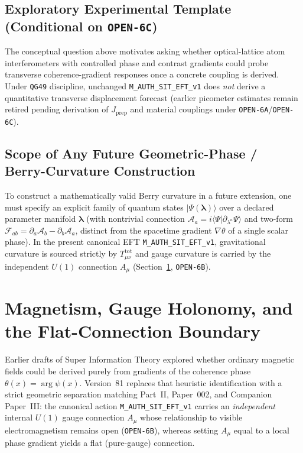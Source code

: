\subsection{Exploratory Experimental Template (Conditional on \texttt{OPEN-6C})}

The conceptual question above motivates asking whether optical-lattice atom interferometers with controlled phase and contrast gradients could probe transverse coherence-gradient responses once a concrete coupling is derived. Under \texttt{QG49} discipline, unchanged \texttt{M\_AUTH\_SIT\_EFT\_v1} does \emph{not} derive a quantitative transverse displacement forecast (earlier picometer estimates remain retired pending derivation of $J_{\mathrm{prep}}$ and material couplings under \texttt{OPEN-6A}/\texttt{OPEN-6C}).

\subsection{Scope of Any Future Geometric-Phase / Berry-Curvature Construction}

To construct a mathematically valid Berry curvature in a future extension, one must specify an explicit family of quantum states $|\Psi(\boldsymbol{\lambda})\rangle$ over a declared parameter manifold $\boldsymbol{\lambda}$ (with nontrivial connection $\mathcal{A}_a = i\langle\Psi|\partial_{\lambda^a}\Psi\rangle$ and two-form $\mathcal{F}_{ab} = \partial_a\mathcal{A}_b - \partial_b\mathcal{A}_a$, distinct from the spacetime gradient $\nabla\theta$ of a single scalar phase). In the present canonical EFT \texttt{M\_AUTH\_SIT\_EFT\_v1}, gravitational curvature is sourced strictly by $T_{\mu\nu}^{\mathrm{tot}}$ and gauge curvature is carried by the independent $U(1)$ connection $A_\mu$ (Section~\ref{sec:magnetism-holonomy}, \texttt{OPEN-6B}).

\vspace{1cm}

\section{Magnetism, Gauge Holonomy, and the Flat-Connection Boundary}
\label{sec:magnetism-holonomy}
\label{sec:magnetism_as_holonomy}

Earlier drafts of Super Information Theory explored whether ordinary magnetic fields could be derived purely from gradients of the coherence phase $\theta(x) = \arg\psi(x)$. Version~81 replaces that heuristic identification with a strict geometric separation matching Part~II, Paper~002, and Companion Paper~III: the canonical action \texttt{M\_AUTH\_SIT\_EFT\_v1} carries an \emph{independent} internal $U(1)$ gauge connection $A_\mu$ whose relationship to visible electromagnetism remains open (\texttt{OPEN-6B}), whereas setting $A_\mu$ equal to a local phase gradient yields a flat (pure-gauge) connection.


